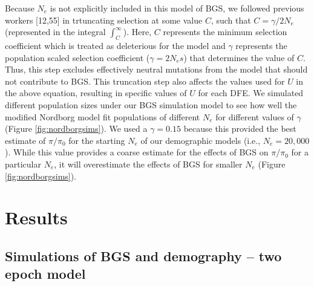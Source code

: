 \documentclass[9pt,twocolumn,twoside]{rilabRxiv}
\begin{document}
Because $N_e$ is not explicitly included in this model of BGS, we followed previous workers [12,55] in trtuncating selection at some value $C$,
such that $C = \gamma/2N_e$ (represented in the integral $\int^{\infty}_C$).
Here, $C$ represents the minimum selection coefficient which is treated as deleterious for the model and $\gamma$ represents the population scaled selection coefficient ($\gamma = 2N_es$) that determines the value of $C$.
Thus, this step excludes effectively neutral mutations from the model that should not contribute to BGS.
This truncation step also affects the values used for $U$ in the above equation, resulting in specific values of $U$ for each DFE.
We simulated different population sizes under our BGS simulation model to see how well the modified Nordborg model fit populations of different $N_e$ for different values of $\gamma$ (Figure \ref{fig:nordborgsims}).
We used a $\gamma = 0.15$ because this provided the best estimate of $\pi/\pi_0$ for the starting $N_e$ of our demographic models (i.e., $N_e = 20,000$).
While this value provides a coarse estimate for the effects of BGS on $\pi/\pi_0$ for a particular $N_e$, it will overestimate the effects of BGS for smaller $N_e$ (Figure \ref{fig:nordborgsims}).

\section{Results}


\subsection{Simulations of BGS and demography -- two epoch model}
\end{document}
